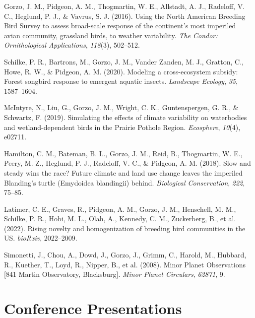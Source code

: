 \documentclass[11pt,a4paper,]{moderncv}
\newlength{\cslhangindent}
\newenvironment{CSLReferences}[2] %
 {\begin{list}{}{%
  \setlength{\itemindent}{0pt}
  \setlength{\leftmargin}{0pt}
  \setlength{\parsep}{0pt}
  \ifodd #1
   \setlength{\leftmargin}{\cslhangindent}
   \setlength{\itemindent}{-1\cslhangindent}
  \fi
  \setlength{\itemsep}{#2\baselineskip}}}
 {\end{list}}
\begin{document}
\label{refs-ac9b1bd4beeebee61ed7fb33c33f685f}
\begin{CSLReferences}{1}{0}
Gorzo, J. M., Pidgeon, A. M., Thogmartin, W. E., Allstadt, A. J.,
Radeloff, V. C., Heglund, P. J., \& Vavrus, S. J. (2016). Using the
North American Breeding Bird Survey to assess broad-scale response of
the continent's most imperiled avian community, grassland birds, to
weather variability. \emph{The Condor: Ornithological Applications},
\emph{118}(3), 502--512.

Schilke, P. R., Bartrons, M., Gorzo, J. M., Vander Zanden, M. J.,
Gratton, C., Howe, R. W., \& Pidgeon, A. M. (2020). Modeling a
cross-ecosystem subsidy: Forest songbird response to emergent aquatic
insects. \emph{Landscape Ecology}, \emph{35}, 1587--1604.

McIntyre, N., Liu, G., Gorzo, J. M., Wright, C. K., Guntenspergen, G.
R., \& Schwartz, F. (2019). Simulating the effects of climate
variability on waterbodies and wetland-dependent birds in the Prairie
Pothole Region. \emph{Ecosphere}, \emph{10}(4), e02711.

Hamilton, C. M., Bateman, B. L., Gorzo, J. M., Reid, B., Thogmartin, W.
E., Peery, M. Z., Heglund, P. J., Radeloff, V. C., \& Pidgeon, A. M.
(2018). Slow and steady wins the race? Future climate and land use
change leaves the imperiled Blanding's turtle (Emydoidea blandingii)
behind. \emph{Biological Conservation}, \emph{222}, 75--85.

Latimer, C. E., Graves, R., Pidgeon, A. M., Gorzo, J. M., Henschell, M.
M., Schilke, P. R., Hobi, M. L., Olah, A., Kennedy, C. M., Zuckerberg,
B., et al. (2022). Rising novelty and homogenization of breeding bird
communities in the US. \emph{bioRxiv}, 2022--2009.

Simonetti, J., Chou, A., Dowd, J., Gorzo, J., Grimm, C., Harold, M.,
Hubbard, R., Kuether, T., Loyd, R., Nipper, B., et al. (2008). Minor
Planet Observations {[}841 Martin Observatory, Blacksburg{]}.
\emph{Minor Planet Circulars}, \emph{62871}, 9.

\end{CSLReferences}

\section{Conference Presentations}\label{conference-presentations}
\end{document}
